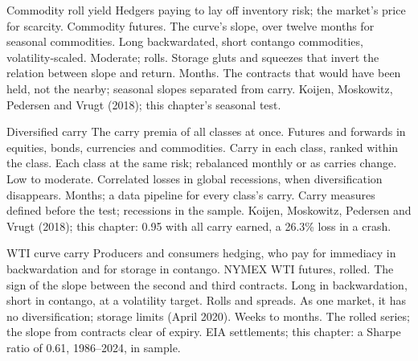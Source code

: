 \begin{strategyfile}{Commodity roll yield}\label{strat:s1:carry-across-asset-classes:commodity}
 Hedgers paying to lay off inventory risk; the market's price for scarcity.
 Commodity futures.
 The curve's slope, over twelve months for seasonal commodities.
 Long backwardated, short contango commodities, volatility-scaled.
 Moderate; rolls.
 Storage gluts and squeezes that invert the relation between slope and return.
 Months.
 The contracts that would have been held, not the nearby; seasonal slopes separated from carry.
 Koijen, Moskowitz, Pedersen and Vrugt (2018); this chapter's seasonal test.
\end{strategyfile}

\begin{strategyfile}{Diversified carry}\label{strat:s1:carry-across-asset-classes:diversified}
 The carry premia of all classes at once.
 Futures and forwards in equities, bonds, currencies and commodities.
 Carry in each class, ranked within the class.
 Each class at the same risk; rebalanced monthly or as carries change.
 Low to moderate.
 Correlated losses in global recessions, when diversification disappears.
 Months; a data pipeline for every class's carry.
 Carry measures defined before the test; recessions in the sample.
 Koijen, Moskowitz, Pedersen and Vrugt (2018); this chapter: 0.95 with all carry earned, a 26.3\% loss in a crash.
\end{strategyfile}

\begin{strategyfile}{WTI curve carry}\label{strat:s1:carry-across-asset-classes:wti}
 Producers and consumers hedging, who pay for immediacy in backwardation and for storage in contango.
 NYMEX WTI futures, rolled.
 The sign of the slope between the second and third contracts.
 Long in backwardation, short in contango, at a volatility target.
 Rolls and spreads.
 As one market, it has no diversification; storage limits (April 2020).
 Weeks to months.
 The rolled series; the slope from contracts clear of expiry.
 EIA settlements; this chapter: a Sharpe ratio of 0.61, 1986--2024, in sample.
\end{strategyfile}

